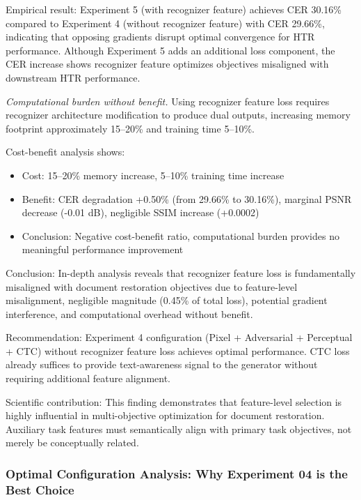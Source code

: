 \documentclass[journal]{IEEEtran}
\begin{document}
Empirical result: Experiment 5 (with recognizer feature) achieves CER 30.16\% compared to Experiment 4 (without recognizer feature) with CER 29.66\%, indicating that opposing gradients disrupt optimal convergence for HTR performance. Although Experiment 5 adds an additional loss component, the CER increase shows recognizer feature optimizes objectives misaligned with downstream HTR performance.

\textit{Computational burden without benefit.} Using recognizer feature loss requires recognizer architecture modification to produce dual outputs, increasing memory footprint approximately 15--20\% and training time 5--10\%.

Cost-benefit analysis shows:
\begin{itemize}
    \item Cost: 15--20\% memory increase, 5--10\% training time increase
    \item Benefit: CER degradation +0.50\% (from 29.66\% to 30.16\%), marginal PSNR decrease (-0.01 dB), negligible SSIM increase (+0.0002)
    \item Conclusion: Negative cost-benefit ratio, computational burden provides no meaningful performance improvement
\end{itemize}

Conclusion: In-depth analysis reveals that recognizer feature loss is fundamentally misaligned with document restoration objectives due to feature-level misalignment, negligible magnitude (0.45\% of total loss), potential gradient interference, and computational overhead without benefit.

Recommendation: Experiment 4 configuration (Pixel + Adversarial + Perceptual + CTC) without recognizer feature loss achieves optimal performance. CTC loss already suffices to provide text-awareness signal to the generator without requiring additional feature alignment.

Scientific contribution: This finding demonstrates that feature-level selection is highly influential in multi-objective optimization for document restoration. Auxiliary task features must semantically align with primary task objectives, not merely be conceptually related.

\subsubsection{Optimal Configuration Analysis: Why Experiment 04 is the Best Choice}
\label{sec:exp04_optimal}
\end{document}
